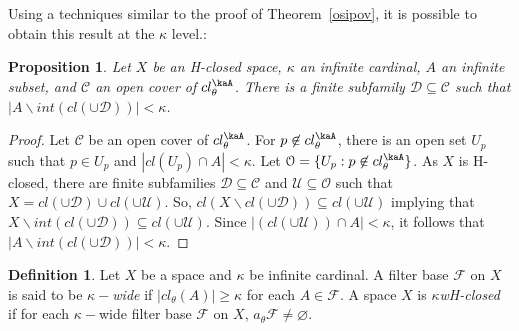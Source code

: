 \documentclass[11pt]{amsart}
\newif\ifdraft\draftfalse
\newtheorem{proposition}[theorem]{Proposition}
\theoremstyle{definition}
\newtheorem{definition}[theorem]{Definition}
\theoremstyle{remark}
\numberwithin{equation}{section}
\begin{document}
Using a techniques similar to the proof of Theorem~\ref{osipov}, it is possible to obtain this result at the $\kappa$ level.:

\begin{proposition}{{\immediate{}}{\ifdraft\hspace{-\lastskip}\vadjust{\vspace{-1mm}\smash{\llap{{\tt {{osipovk}}}\hspace{8mm}}}\vspace{1mm}}\fi}}  Let $X$ be an H-closed space, ${\kappa}$ an infinite cardinal, $A$ an infinite subset,  and ${\ensuremath{\mathcal{{C}}}}$  an open cover of $cl_{\theta }^\kaA$.  There is a finite subfamily ${\ensuremath{\mathcal{{D}}}} \subseteq {\ensuremath{\mathcal{{C}}}}$ such that    $|A \backslash int(cl(\cup{\ensuremath{\mathcal{{D}}}}))| < {\kappa}$. 
\end{proposition}

\begin{proof} Let ${\ensuremath{\mathcal{{C}}}}$ be an open cover of $cl_{\theta }^\kaA$.  For $p\not\in cl_{\theta }^\kaA$, there is an open set $U_p$ such that $p \in U_p$ and $|cl(U_p) \cap A| < {\kappa}$.  Let ${\ensuremath{\mathcal{{O}}}} = \{U_p: p \not\in cl_{\theta }^\kaA\}$.
As $X$ is H-closed, there are finite subfamilies ${\ensuremath{\mathcal{{D}}}} \subseteq{\ensuremath{\mathcal{{C}}}}$ and ${\ensuremath{\mathcal{{U}}}} \subseteq{\ensuremath{\mathcal{{O}}}}$ such that $X = cl(\cup{\ensuremath{\mathcal{{D}}}}) \cup cl(\cup{\ensuremath{\mathcal{{U}}}})$.  So, $cl(X\backslash cl(\cup{\ensuremath{\mathcal{{D}}}})) \subseteq cl(\cup{\ensuremath{\mathcal{{U}}}})$ implying that $X\backslash int(cl(\cup{\ensuremath{\mathcal{{D}}}})) \subseteq cl(\cup{\ensuremath{\mathcal{{U}}}})$.  Since $|(cl(\cup{\ensuremath{\mathcal{{U}}}})) \cap A| < {\kappa}$, it follows that $|A\backslash int(cl(\cup{\ensuremath{\mathcal{{D}}}}))| < {\kappa}$. \end{proof}

\begin{definition}{{\immediate{}}{\ifdraft\hspace{-\lastskip}\vadjust{\vspace{-1mm}\smash{\llap{{\tt {{kwHclosed}}}\hspace{8mm}}}\vspace{1mm}}\fi}}
Let $X$ be a space and $\kappa$ be infinite cardinal.  A  filter base ${\ensuremath{\mathcal{{F}}}}$ on $X$ is said to be $\kappa-${\it wide} if $|cl_{\theta}(A)| \geq \kappa$ for each $A \in{\ensuremath{\mathcal{{F}}}}$. A space $X$ is $\kappa$\emph{wH-closed} if for each $\kappa-$wide filter base ${\ensuremath{\mathcal{{F}}}}$ on $X$, $a_{\theta}{\ensuremath{\mathcal{{F}}}}\ne \varnothing$.
\end{definition}
 
\end{document}

